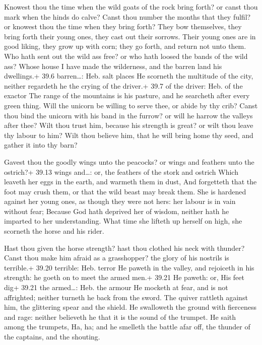  Knowest thou the time when the wild goats of the rock bring
forth? or canst thou mark when the hinds do calve?  Canst
thou number the months that they fulfil? or knowest thou the time when
they bring forth?  They bow themselves, they bring forth
their young ones, they cast out their sorrows.  Their young
ones are in good liking, they grow up with corn; they go forth, and
return not unto them.  Who hath sent out the wild ass free?
or who hath loosed the bands of the wild ass?  Whose house I
have made the wilderness, and the barren land his dwellings.+ 39.6
barren\ldots: Heb. salt places  He scorneth the multitude of
the city, neither regardeth he the crying of the driver.+ 39.7 of the
driver: Heb. of the exactor  The range of the mountains is
his pasture, and he searcheth after every green thing.  Will
the unicorn be willing to serve thee, or abide by thy crib?
 Canst thou bind the unicorn with his band in the furrow?
or will he harrow the valleys after thee?  Wilt thou trust
him, because his strength is great? or wilt thou leave thy labour to
him?  Wilt thou believe him, that he will bring home thy
seed, and gather it into thy barn?

 Gavest thou the goodly wings unto the peacocks? or wings
and feathers unto the ostrich?+ 39.13 wings and\ldots: or, the feathers
of the stork and ostrich  Which leaveth her eggs in the
earth, and warmeth them in dust,  And forgetteth that the
foot may crush them, or that the wild beast may break them.
 She is hardened against her young ones, as though they
were not hers: her labour is in vain without fear;  Because
God hath deprived her of wisdom, neither hath he imparted to her
understanding.  What time she lifteth up herself on high,
she scorneth the horse and his rider.

 Hast thou given the horse strength? hast thou clothed his
neck with thunder?  Canst thou make him afraid as a
grasshopper? the glory of his nostrils is terrible.+ 39.20 terrible:
Heb. terror  He paweth in the valley, and rejoiceth in his
strength: he goeth on to meet the armed men.+ 39.21 He paweth: or, His
feet dig+ 39.21 the armed\ldots: Heb. the armour  He
mocketh at fear, and is not affrighted; neither turneth he back from the
sword.  The quiver rattleth against him, the glittering
spear and the shield.  He swalloweth the ground with
fierceness and rage: neither believeth he that it is the sound of the
trumpet.  He saith among the trumpets, Ha, ha; and he
smelleth the battle afar off, the thunder of the captains, and the
shouting.


